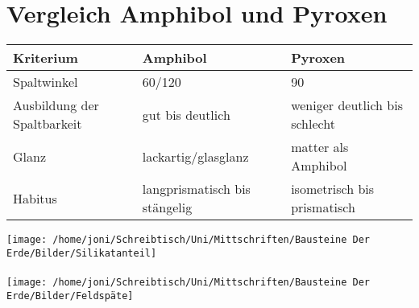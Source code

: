 \documentclass[a4, 12pt]{scrreprt}
\begin{document}
\chapter{Vergleich Amphibol und Pyroxen}
\begin{tabular}{l|p{7cm}@{}p{7cm}@{}}
Kriterium & Amphibol & Pyroxen\\
\hline
Spaltwinkel & 60/120 & 90\\
Ausbildung der Spaltbarkeit & gut bis deutlich & weniger deutlich bis schlecht\\
Glanz & lackartig/glasglanz & matter als Amphibol\\
Habitus & langprismatisch bis stängelig & isometrisch bis prismatisch\\
\end{tabular}

\newpage
\texttt{[image: /home/joni/Schreibtisch/Uni/Mittschriften/Bausteine Der Erde/Bilder/Silikatanteil]}\\
\\
\texttt{[image: /home/joni/Schreibtisch/Uni/Mittschriften/Bausteine Der Erde/Bilder/Feldspäte]}
\end{document}
